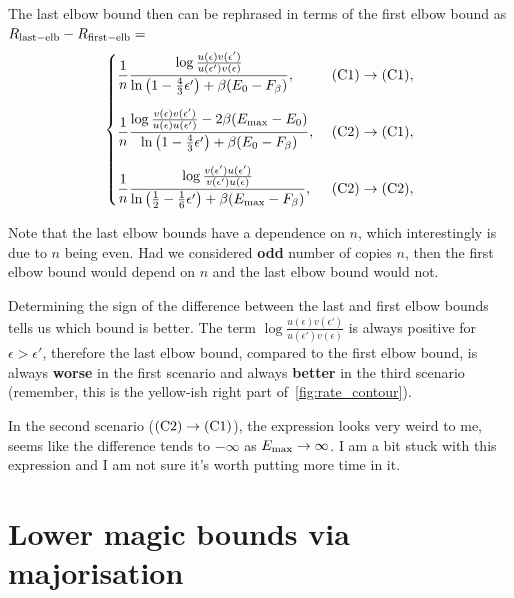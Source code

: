 \documentclass[pra,
aps,
twocolumn,
superscriptaddress,
groupedaddress,
nofootinbib,
reprint
]{revtex4-1}
\begin{document}
The last elbow bound then can be rephrased in terms of the first elbow bound as $R_{\rm{last-elb}} - R_{\rm{first-elb}} = $
\begin{equation}\label{eq:last_elb_coords}
	\begin{cases}
		\dfrac{1}{n} \dfrac{\log{\frac{u(\epsilon)v(\epsilon')}{u(\epsilon')v(\epsilon)}}}{\ln{\big( 1-\frac{4}{3}\epsilon' \big)} + \beta (E_0 - F_\beta)},\ &\rm{(C1)} \rightarrow \rm{(C1)}, \vspace{10pt}\\
		\dfrac{1}{n} \dfrac{\log{\frac{v(\epsilon)v(\epsilon')}{u(\epsilon)u(\epsilon')}} - 2\beta(E_{\rm{max}} - E_0)}{\ln{\big( 1-\frac{4}{3}\epsilon' \big)} + \beta (E_0 - F_\beta)},\ &\rm{(C2)} \rightarrow \rm{(C1)}, \vspace{10pt}\\
		\dfrac{1}{n} \dfrac{\log{\frac{v(\epsilon')u(\epsilon')}{v(\epsilon')u(\epsilon)}}}{\ln{\big( \frac{1}{2}-\frac{1}{6}\epsilon' \big)} + \beta (E_{\rm{max}} - F_\beta)},\ &\rm{(C2)} \rightarrow \rm{(C2)}, 
	\end{cases}
\end{equation}

Note that the last elbow bounds have a dependence on $n$, which interestingly is due to $n$ being even.
Had we considered \textbf{odd} number of copies $n$, then the first elbow bound would depend on $n$ and the last elbow bound would not.

Determining the sign of the difference between the last and first elbow bounds tells us which bound is better.
The term $\log{\frac{u(\epsilon)v(\epsilon')}{u(\epsilon')v(\epsilon)}}$ is always positive for $\epsilon > \epsilon'$, therefore the last elbow bound, compared to the first elbow bound, is always \textbf{worse} in the first scenario and always \textbf{better} in the third scenario (remember, this is the yellow-ish right part of~\cref{fig:rate_contour}).

In the second scenario ($\rm{(C2)} \rightarrow \rm{(C1)}$), the expression looks very weird to me, seems like the difference tends to $-\infty$ as $E_{\rm{max}} \rightarrow \infty$.
I am a bit stuck with this expression and I am not sure it's worth putting more time in it.


\section{Lower magic bounds via majorisation}
\label{sec:lower_bounds}
\end{document}
